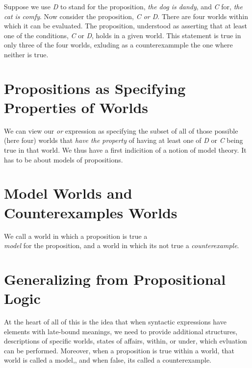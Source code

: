 \documentclass{book}
\begin{document}
Suppose we use \emph{D} to stand for the proposition,
\emph{the dog is dandy}, and \emph{C} for, \emph{the cat is comfy}.
Now consider the proposition, \emph{C or D}. There are
four worlds within which it can be evaluated. The
proposition, understood as asserting that at least
one of the conditions, \emph{C} or \emph{D}, holds in a given
world. This statement is true in only three of the
four worlds, exluding as a counterexammple the one
where neither is true.

\hypertarget{pandoc.profile.debug__pandoc__debug__src__modeltheory.md__propositions-as-specifying-properties-of-worlds}{%
\section*{Propositions as Specifying Properties of Worlds}\label{pandoc.profile.debug__pandoc__debug__src__modeltheory.md__propositions-as-specifying-properties-of-worlds}}

We can view our \emph{or} expression as specifying the
subset of all of those possible (here four) worlds
that \emph{have the property} of having at least one of
\emph{D} or \emph{C} being true in that world. We thus have a
first indicition of a notion of model theory. It has
to be about models of propositions.

\hypertarget{pandoc.profile.debug__pandoc__debug__src__modeltheory.md__model-worlds-and-counterexamples-worlds}{%
\section*{Model Worlds and Counterexamples Worlds}\label{pandoc.profile.debug__pandoc__debug__src__modeltheory.md__model-worlds-and-counterexamples-worlds}}

We call a world in which a proposition is true a\\
\emph{model} for the proposition, and a world in which
it\textquotesingle s not true a \emph{counterexample}.

\hypertarget{pandoc.profile.debug__pandoc__debug__src__modeltheory.md__generalizing-from-propositional-logic}{%
\section*{Generalizing from Propositional Logic}\label{pandoc.profile.debug__pandoc__debug__src__modeltheory.md__generalizing-from-propositional-logic}}

At the heart of all of this is the idea that when
syntactic expressions have elements with late-bound
meanings, we need to provide additional structures,
descriptions of specific worlds, states of affairs,
within, or under, which evluation can be performed.
Moreover, when a proposition is true within a world,
that world is called a model,, and when false, it\textquotesingle s
called a counterexample.
\end{document}

